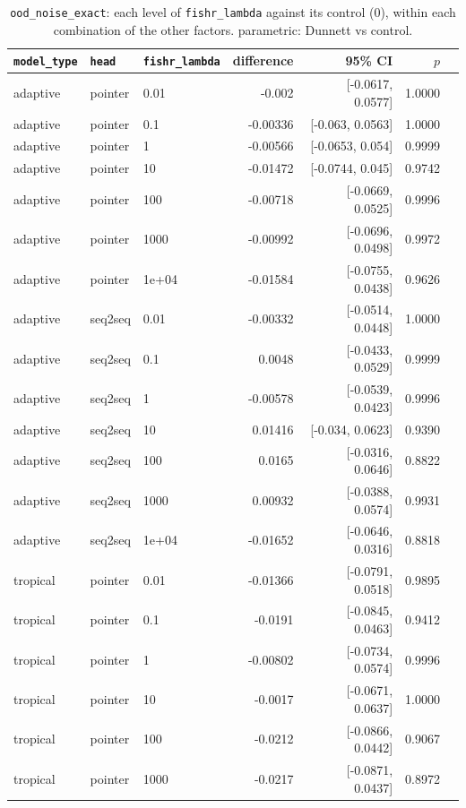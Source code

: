 \documentclass[10pt]{article}
\begin{document}
{\small
\begin{longtable}{lllrrrl}
\caption{\texttt{ood\_noise\_exact}: each level of \texttt{fishr\_lambda} against its control (0), within each combination of the other factors. parametric: Dunnett vs control.}\label{tab:control-ood_noise_exact}\\
\toprule
\texttt{model\_type} & \texttt{head} & \texttt{fishr\_lambda} & difference & 95\% CI & $p$ & \\
\midrule
\endhead
adaptive & pointer & 0.01 & -0.002 & [-0.0617, 0.0577] & 1.0000 & \\
adaptive & pointer & 0.1 & -0.00336 & [-0.063, 0.0563] & 1.0000 & \\
adaptive & pointer & 1 & -0.00566 & [-0.0653, 0.054] & 0.9999 & \\
adaptive & pointer & 10 & -0.01472 & [-0.0744, 0.045] & 0.9742 & \\
adaptive & pointer & 100 & -0.00718 & [-0.0669, 0.0525] & 0.9996 & \\
adaptive & pointer & 1000 & -0.00992 & [-0.0696, 0.0498] & 0.9972 & \\
adaptive & pointer & 1e+04 & -0.01584 & [-0.0755, 0.0438] & 0.9626 & \\
adaptive & seq2seq & 0.01 & -0.00332 & [-0.0514, 0.0448] & 1.0000 & \\
adaptive & seq2seq & 0.1 & 0.0048 & [-0.0433, 0.0529] & 0.9999 & \\
adaptive & seq2seq & 1 & -0.00578 & [-0.0539, 0.0423] & 0.9996 & \\
adaptive & seq2seq & 10 & 0.01416 & [-0.034, 0.0623] & 0.9390 & \\
adaptive & seq2seq & 100 & 0.0165 & [-0.0316, 0.0646] & 0.8822 & \\
adaptive & seq2seq & 1000 & 0.00932 & [-0.0388, 0.0574] & 0.9931 & \\
adaptive & seq2seq & 1e+04 & -0.01652 & [-0.0646, 0.0316] & 0.8818 & \\
tropical & pointer & 0.01 & -0.01366 & [-0.0791, 0.0518] & 0.9895 & \\
tropical & pointer & 0.1 & -0.0191 & [-0.0845, 0.0463] & 0.9412 & \\
tropical & pointer & 1 & -0.00802 & [-0.0734, 0.0574] & 0.9996 & \\
tropical & pointer & 10 & -0.0017 & [-0.0671, 0.0637] & 1.0000 & \\
tropical & pointer & 100 & -0.0212 & [-0.0866, 0.0442] & 0.9067 & \\
tropical & pointer & 1000 & -0.0217 & [-0.0871, 0.0437] & 0.8972 & \\

\end{longtable}}
\end{document}
